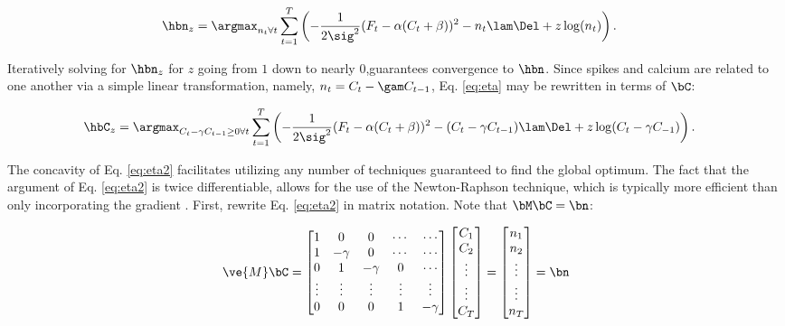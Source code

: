 \begin{align} \label{eq:eta}
\hbn_{\zzz} &= \argmax_{n_t \forall t}  \sum_{t=1}^T \left( -\frac{1}{2 \sig^2}(F_t - \alpha(C_t + \beta))^2  -  n_t  \lam \Del + \zzz \log(n_t) \right).
\end{align}

\noindent Iteratively solving for $\hbn_{\zzz}$ for $z$ going from $1$ down to nearly $0$,guarantees convergence to $\hbn$. Since spikes and calcium are related to one another via a simple linear transformation, namely, $n_t=C_t-\gam C_{t-1}$, Eq. \eqref{eq:eta} may be rewritten in terms of $\bC$:

\begin{align} 
\hbC_{\zzz} &= \argmax_{C_t - \gamma C_{t-1} \geq 0 \forall t} \sum_{t=1}^{T} \left( -\frac{1}{2 \sig^2} (F_t -\alpha (C_t + \beta))^2  - (C_t - \gamma C_{t-1}) \lam \Del + \zzz \log(C_t - \gamma C_{-1}) \right). \label{eq:eta2}
\end{align}

\noindent The concavity of Eq. \eqref{eq:eta2} facilitates utilizing any number of techniques guaranteed to find the global optimum.  The fact that the argument of Eq. \eqref{eq:eta2} is twice differentiable, allows for the use of the Newton-Raphson technique, which is typically more efficient than only incorporating the gradient \cite{CONV04}. First, rewrite Eq. \eqref{eq:eta2} in matrix notation.  Note that $\bM \bC = \bn$:

\begin{align} \label{eq:M}
\ve{M} \bC = %
\begin{bmatrix}
1 & 0  & 0 & \cdots & \cdots \\
1 & -\gamma & 0 & \cdots & \cdots \\
0 & 1 & -\gamma & 0 & \cdots  \\
\vdots & \vdots & \vdots & \vdots & \vdots  \\
0 & 0 & 0 & 1 & -\gamma
\end{bmatrix}
\begin{bmatrix}
C_1 \\ C_2 \\ \vdots \\ \vdots \\ C_T  
\end{bmatrix}
= 
\begin{bmatrix}
n_1 \\ n_2 \\ \vdots \\ \vdots \\ n_T
\end{bmatrix}
= \bn
\end{align}

